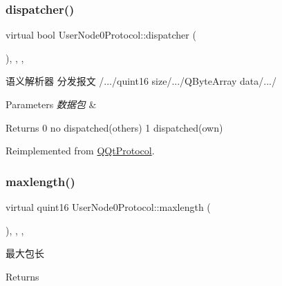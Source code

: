 \subsubsection{\texorpdfstring{dispatcher()}{dispatcher()}}
{\footnotesize\ttfamily virtual bool User\+Node0\+Protocol\+::dispatcher (\begin{DoxyParamCaption}\item[{const Q\+Byte\+Array \&}]{ }\end{DoxyParamCaption})\hspace{0.3cm}{\ttfamily [inline]}, {\ttfamily [override]}, {\ttfamily [protected]}, {\ttfamily [virtual]}}



语义解析器 分发报文 /.../quint16 size/.../\+Q\+Byte\+Array data/.../ 


\begin{DoxyParams}{Parameters}
{\em 数据包} & \\
\hline
\end{DoxyParams}
\begin{DoxyReturn}{Returns}
0 no dispatched(others) 1 dispatched(own) 
\end{DoxyReturn}


Reimplemented from \mbox{\hyperlink{class_q_qt_protocol_a35a69c4b89c8cf7459038f40d75e0dc9}{Q\+Qt\+Protocol}}.

\mbox{\label{class_user_node0_protocol_a97b6c29520fc6df873e0062ff337103b}} 
\subsubsection{\texorpdfstring{maxlength()}{maxlength()}}
{\footnotesize\ttfamily virtual quint16 User\+Node0\+Protocol\+::maxlength (\begin{DoxyParamCaption}{ }\end{DoxyParamCaption})\hspace{0.3cm}{\ttfamily [inline]}, {\ttfamily [override]}, {\ttfamily [protected]}, {\ttfamily [virtual]}}



最大包长 

\begin{DoxyReturn}{Returns}

\end{DoxyReturn}


